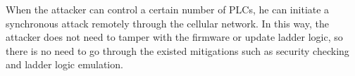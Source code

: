 When the attacker can control a certain number of PLCs, he can initiate a synchronous attack remotely through the cellular network. In this way, the attacker does not need to tamper with the firmware or update ladder logic, so there is no need to go through the existed mitigations such as security checking and ladder logic emulation.


%
%
%
%
%
%
